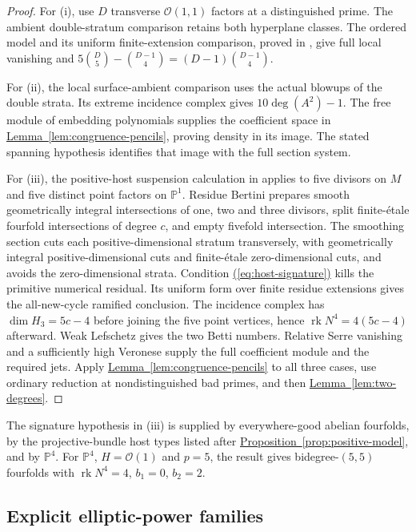 \documentclass[11pt,a4paper]{article}
\theoremstyle{definition}
\theoremstyle{remark}\newtheorem{remark}[theorem]{Remark}
\numberwithin{equation}{section}
\newcommand{\PP}{\mathbb P}\newcommand{\LL}{\mathbb L}
\newcommand{\rk}{\operatorname{rk}}\newcommand{\im}{\operatorname{im}}
\newcommand{\propref}[1]{\hyperref[#1]{\textcolor{resultlink}{Proposition~\ref*{#1}}}}
\newcommand{\lemref}[1]{\hyperref[#1]{\textcolor{resultlink}{Lemma~\ref*{#1}}}}
\renewcommand{\eqref}[1]{\hyperref[#1]{\textcolor{equationlink}{(\ref*{#1})}}}
\begin{document}
\begin{proof}
For (i), use $D$ transverse $\mathcal O(1,1)$ factors at a
distinguished prime. The ambient double-stratum comparison retains
both hyperplane classes. The ordered model and its uniform
finite-extension comparison, proved in \cite{InternalDense}, give
full local vanishing and
$5\binom D5-\binom{D-1}4=(D-1)\binom{D-1}4$.

For (ii), the local surface-ambient comparison uses the actual
blowups of the double strata. Its extreme incidence complex gives
$10\deg(A^2)-1$. The free module of embedding polynomials supplies
the coefficient space in \lemref{lem:congruence-pencils}, proving
density in its image. The stated spanning hypothesis identifies
that image with the full section system.

For (iii), the positive-host suspension calculation in
\cite{InternalPositiveHosts} applies to five divisors on $M$
and five distinct point factors on $\PP^1$. Residue Bertini
prepares smooth geometrically integral intersections of one,
two and three divisors, split finite-\'etale fourfold intersections
of degree $c$, and empty fivefold intersection. The smoothing
section cuts each positive-dimensional stratum transversely,
with geometrically integral positive-dimensional cuts and
finite-\'etale zero-dimensional cuts, and avoids the
zero-dimensional strata. Condition \eqref{eq:host-signature} kills
the primitive numerical residual. Its uniform form over finite
residue extensions gives the all-new-cycle ramified conclusion.
The incidence complex has $\dim H_3=5c-4$ before joining the
five point vertices, hence $\rk N^4=4(5c-4)$ afterward.
Weak Lefschetz gives the two Betti numbers. Relative Serre
vanishing and a sufficiently high Veronese supply the full
coefficient module and the required jets. Apply
\lemref{lem:congruence-pencils} to all three cases, use ordinary
reduction at nondistinguished bad primes, and then
\lemref{lem:two-degrees}.
\end{proof}

The signature hypothesis in (iii) is supplied by everywhere-good
abelian fourfolds, by the projective-bundle host types listed after
\propref{prop:positive-model}, and by $\PP^4$. For $\PP^4$,
$H=\mathcal O(1)$ and $p=5$, the result gives bidegree-$(5,5)$
fourfolds with $\rk N^4=4$, $b_1=0$, $b_2=2$.

\subsection{Explicit elliptic-power families}
\end{document}
